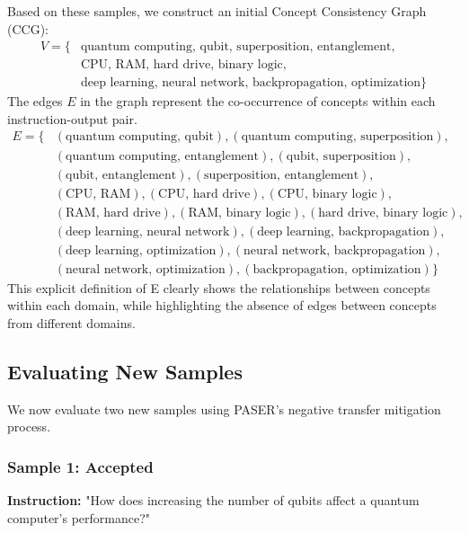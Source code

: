 Based on these samples, we construct an initial Concept Consistency Graph (CCG):
\begin{equation*}
\begin{aligned}
V = \{&\text{quantum computing, qubit, superposition, entanglement,} \\
      &\text{CPU, RAM, hard drive, binary logic,} \\
      &\text{deep learning, neural network, backpropagation, optimization}\}
\end{aligned}
\end{equation*}
The edges $E$ in the graph represent the co-occurrence of concepts within each instruction-output pair.
\begin{equation*}
\begin{aligned}
E = \{&(\text{quantum computing, qubit}), (\text{quantum computing, superposition}), \\
      &(\text{quantum computing, entanglement}), (\text{qubit, superposition}), \\
      &(\text{qubit, entanglement}), (\text{superposition, entanglement}), \\
      &(\text{CPU, RAM}), (\text{CPU, hard drive}), (\text{CPU, binary logic}), \\
      &(\text{RAM, hard drive}), (\text{RAM, binary logic}), (\text{hard drive, binary logic}), \\
      &(\text{deep learning, neural network}), (\text{deep learning, backpropagation}), \\
      &(\text{deep learning, optimization}), (\text{neural network, backpropagation}), \\
      &(\text{neural network, optimization}), (\text{backpropagation, optimization})\}
\end{aligned}
\end{equation*}
This explicit definition of E clearly shows the relationships between concepts within each domain, while highlighting the absence of edges between concepts from different domains.

\subsection{Evaluating New Samples}
We now evaluate two new samples using PASER's negative transfer mitigation process.

\subsubsection{Sample 1: Accepted}
\textbf{Instruction:} "How does increasing the number of qubits affect a quantum computer's performance?"

